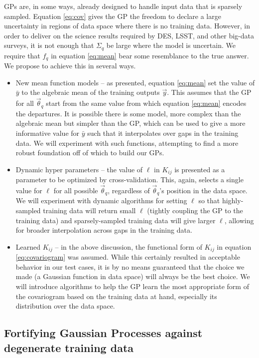 \documentclass[useAMS,usenatbib,tightenlines,11pt,preprint]{aastex}
\begin{document}
GPs are, in some ways, already designed to handle input data that is sparsely
sampled.  Equation \ref{eq:cov} gives the GP the freedom to declare a large
uncertainty in regions of data space where there is no training data.  However,
in order to deliver on the science results required by DES, LSST, and other
big-data surveys, it is not enough that $\Sigma_q$ be large where the model is
uncertain.  We require that $f_q$ in equation \ref{eq:mean} bear some
resemblance to the true answer.  We propose to achieve this in several ways.
\begin{itemize}
\item New mean function models -- as presented,
equation \ref{eq:mean} set the value of $\bar{y}$ to the algebraic mean of the
training outputs $\vec{y}$.  This assumes that the GP for all $\vec{\theta}_q$
start from the same value from which equation \ref{eq:mean} encodes the
departures.  It is possible there is some model, more complex than the algebraic
mean but simpler than the GP, which can be used to give a more informative value
for $\bar{y}$ such that it interpolates over gaps in the training data.  We will
experiment with such functions, attempting to find a more robust foundation off
of which to build our GPs.

\item Dynamic hyper parameters -- the value of $\ell$ in $K_{ij}$ is presented
as a parameter to be optimized by cross-validation.  This, again, selects a
single value for $\ell$ for all possible $\vec{\theta}_q$, regardless of
$\vec{\theta}_q$'s position in the data space.  We will experiment with
dynamic algorithms for setting $\ell$ so that highly-sampled training data will
return small $\ell$ (tightly coupling the GP to the training data) and
sparsely-sampled training data will give larger $\ell$, allowing for broader
interpolation across gaps in the training data.

\item Learned $K_{ij}$ -- in the above discussion, the functional form of
$K_{ij}$ in equation \ref{eq:covariogram}
was assumed.  While this certainly resulted in acceptable behavior in
our test cases, it is by no means guaranteed that the choice we made (a Gaussian
function in data space) will always be the best choice.  We will introduce
algorithms to help the GP learn the most appropriate form of the covariogram
based on the training data at hand, especially its distribution over the data
space.
\end{itemize}

\subsection{Fortifying Gaussian Processes against degenerate training data}
\end{document}
